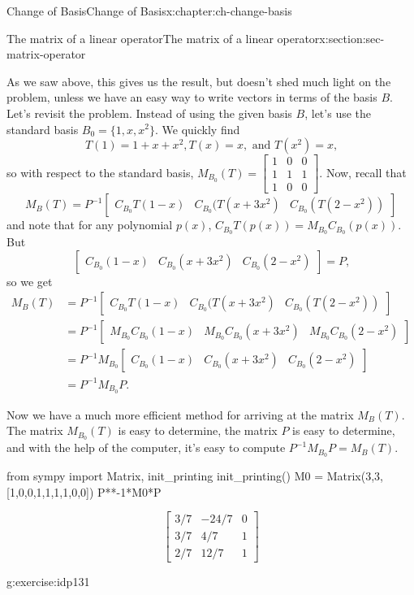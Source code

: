 \documentclass[oneside,10pt,]{book}
\numberwithin{equation}{section}
\newcommand{\bbm}{\begin{bmatrix}}
\newcommand{\ebm}{\end{bmatrix}}
\newcommand{\amp}{&}
\begin{document}
\begin{chapterptx}{Change of Basis}{}{Change of Basis}{}{}{x:chapter:ch-change-basis}
\begin{sectionptx}{The matrix of a linear operator}{}{The matrix of a linear operator}{}{}{x:section:sec-matrix-operator}
%
\par
As we saw above, this gives us the result, but doesn't shed much light on the problem, unless we have an easy way to write vectors in terms of the basis \(B\). Let's revisit the problem. Instead of using the given basis \(B\), let's use the standard basis \(B_0 = \{1,x,x^2\}\). We quickly find%
\begin{equation*}
T(1)=1+x+x^2, T(x) = x, \text{ and } T(x^2)=x\text{,}
\end{equation*}
so with respect to the standard basis, \(M_{B_0}(T) = \bbm 1\amp 0\amp 0\\1\amp 1\amp 1\\1\amp 0\amp 0\ebm\). Now, recall that%
\begin{equation*}
M_{B}(T)=P^{-1}\bbm C_{B_0}T(1-x)\amp C_{B_0}(T(x+3x^2)\amp C_{B_0}(T(2-x^2))\ebm
\end{equation*}
and note that for any polynomial \(p(x)\), \(C_{B_0}T(p(x)) = M_{B_0}C_{B_0}(p(x))\). But%
\begin{equation*}
\bbm C_{B_0}(1-x) \amp C_{B_0}(x+3x^2)\amp C_{B_0}(2-x^2)\ebm = P\text{,}
\end{equation*}
so we get%
\begin{align*}
M_B(T) \amp = P^{-1}\bbm C_{B_0}T(1-x)\amp C_{B_0}(T(x+3x^2)\amp C_{B_0}(T(2-x^2))\ebm\\
\amp = P^{-1}\bbm M_{B_0}C_{B_0}(1-x)\amp M_{B_0}C_{B_0}(x+3x^2)\amp M_{B_0}C_{B_0}(2-x^2)\ebm \\
\amp = P^{-1}M_{B_0}\bbm C_{B_0}(1-x) \amp C_{B_0}(x+3x^2)\amp C_{B_0}(2-x^2)\ebm\\
\amp = P^{-1}M_{B_0}P\text{.}
\end{align*}
%
\par
Now we have a much more efficient method for arriving at the matrix \(M_B(T)\). The matrix \(M_{B_0}(T)\) is easy to determine, the matrix \(P\) is easy to determine, and with the help of the computer, it's easy to compute \(P^{-1}M_{B_0}P = M_B(T)\).%
\begin{sageinput}
from sympy import Matrix, init_printing
init_printing()
M0 = Matrix(3,3,[1,0,0,1,1,1,1,0,0])
P**-1*M0*P
\end{sageinput}
\begin{sageoutput}
\[\bbm 3/7\amp -24/7\amp 0\\3/7\amp 4/7\amp 1\\2/7\amp 12/7\amp 1\ebm\]
\end{sageoutput}
\begin{inlineexercise}{}{g:exercise:idp131}%

\end{inlineexercise}
\end{sectionptx}
\end{chapterptx}
\end{document}
